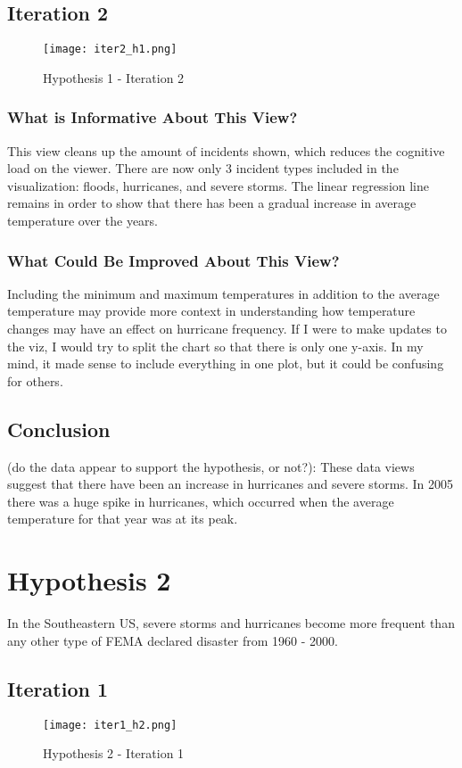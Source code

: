 \documentclass[11pt, letter]{article}
\begin{document}
\subsection*{Iteration 2}
\begin{figure}[h!]
    \centering
    \texttt{[image: iter2\_h1.png]}
    \caption{Hypothesis 1 - Iteration 2}
    \label{fig:my_label}
\end{figure}

\subsubsection*{What is Informative About This View?}
This view cleans up the amount of incidents shown, which reduces the cognitive load on the viewer. There are now only 3 incident types included in the visualization: floods, hurricanes, and severe storms. The linear regression line remains in order to show that there has been a gradual increase in average temperature over the years.

\subsubsection*{What Could Be Improved About This View?}
Including the minimum and maximum temperatures in addition to the average temperature may provide more context in understanding how temperature changes may have an effect on hurricane frequency. If I were to make updates to the viz, I would try to split the chart so that there is only one y-axis. In my mind, it made sense to include everything in one plot, but it could be confusing for others.

\subsection*{Conclusion}
 (do the data appear to support the hypothesis, or not?): These data views suggest that there have been an increase in hurricanes and severe storms. In 2005 there was a huge spike in hurricanes, which occurred when the average temperature for that year was at its peak. 
 
\section*{Hypothesis 2}
In the Southeastern US, severe storms and hurricanes become more frequent than any other type of FEMA declared disaster from 1960 - 2000. 

\subsection*{Iteration 1}
\begin{figure}[h]
    \centering
    \texttt{[image: iter1\_h2.png]}
    \caption{Hypothesis 2 - Iteration 1}
    \label{fig:my_label}
\end{figure}
\end{document}
